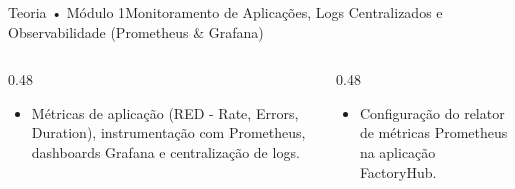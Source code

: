 \begin{senaiframe}{Teoria • Módulo 1}{Monitoramento de Aplicações, Logs Centralizados e Observabilidade (Prometheus & Grafana)}
  \begin{columns}[t]
    \begin{column}{0.48\textwidth}
      \begin{tcolorbox}[senaibluecard, title={Fundamentos Teóricos}]
        \begin{itemize}
          \item Métricas de aplicação (RED - Rate, Errors, Duration), instrumentação com Prometheus, dashboards Grafana e centralização de logs.
        \end{itemize}
      \end{tcolorbox}
    \end{column}
    \begin{column}{0.48\textwidth}
      \begin{tcolorbox}[senaigreencard, title={Prática \& Laboratório}]
        \begin{itemize}
          \item Configuração do relator de métricas Prometheus na aplicação FactoryHub.
        \end{itemize}
      \end{tcolorbox}
    \end{column}
  \end{columns}
\end{senaiframe}
